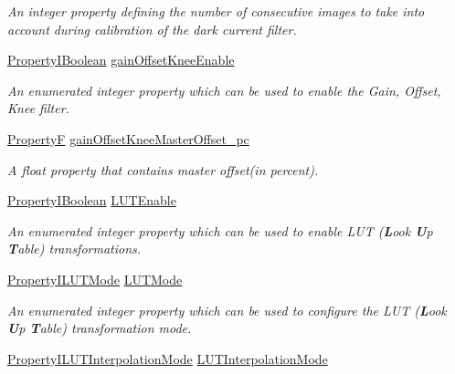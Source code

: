 \begin{DoxyCompactItemize}
\begin{DoxyCompactList}\small\item\em An integer property defining the number of consecutive images to take into account during calibration of the dark current filter. \end{DoxyCompactList}\item 
\hyperlink{group___common_interface_ga44f9437e24b21b6c93da9039ec6786aa}{Property\+I\+Boolean} \hyperlink{classmv_i_m_p_a_c_t_1_1acquire_1_1_image_processing_abe7ed4cb142288de179ce4e86b314ad6}{gain\+Offset\+Knee\+Enable}
\begin{DoxyCompactList}\small\item\em An enumerated integer property which can be used to enable the Gain, Offset, Knee filter. \end{DoxyCompactList}\item 
\hyperlink{group___common_interface_gaf54865fe5a3d5cfd15f9a111b40d09f9}{Property\+F} \hyperlink{classmv_i_m_p_a_c_t_1_1acquire_1_1_image_processing_ad5b601b18f53f6b93f8f058225fae0ec}{gain\+Offset\+Knee\+Master\+Offset\+\_\+pc}
\begin{DoxyCompactList}\small\item\em A float property that contains master offset(in percent). \end{DoxyCompactList}\item 
\hyperlink{group___common_interface_ga44f9437e24b21b6c93da9039ec6786aa}{Property\+I\+Boolean} \hyperlink{classmv_i_m_p_a_c_t_1_1acquire_1_1_image_processing_a7f8eb83578d97fde3405e6ae5d09e5c3}{L\+U\+T\+Enable}
\begin{DoxyCompactList}\small\item\em An enumerated integer property which can be used to enable L\+U\+T ({\bfseries L}ook {\bfseries U}p {\bfseries T}able) transformations. \end{DoxyCompactList}\item 
\hyperlink{group___common_interface_ga64e784bb1c97e3a3eed6ff572935e5d2}{Property\+I\+L\+U\+T\+Mode} \hyperlink{classmv_i_m_p_a_c_t_1_1acquire_1_1_image_processing_ae2f3059a3574e6a08a2d4348f1d5a152}{L\+U\+T\+Mode}
\begin{DoxyCompactList}\small\item\em An enumerated integer property which can be used to configure the L\+U\+T ({\bfseries L}ook {\bfseries U}p {\bfseries T}able) transformation mode. \end{DoxyCompactList}\item 
\hyperlink{group___common_interface_ga2b9fd1a0f1dcf0867c527f11a1a1da65}{Property\+I\+L\+U\+T\+Interpolation\+Mode} \hyperlink{classmv_i_m_p_a_c_t_1_1acquire_1_1_image_processing_a5ce44c89f01342416d0c3d37c16056cb}{L\+U\+T\+Interpolation\+Mode}

\end{DoxyCompactItemize}
